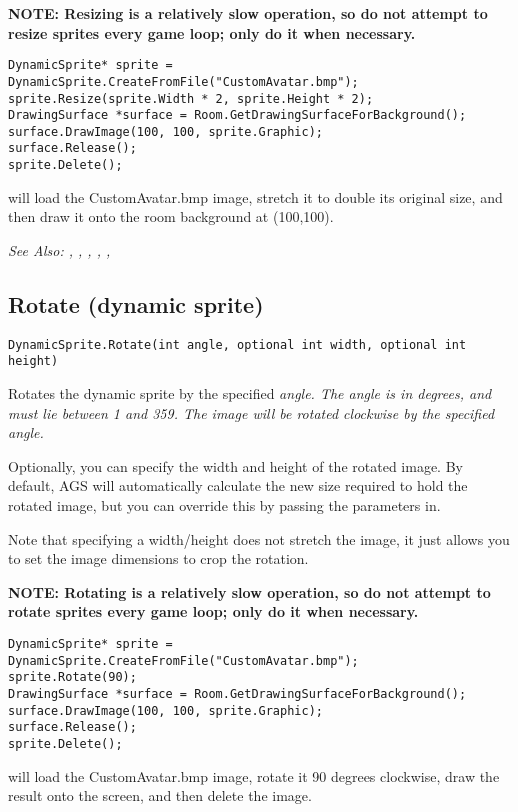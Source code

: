 \bf{NOTE:} Resizing is a relatively slow operation, so do not attempt to resize sprites
every game loop; only do it when necessary.

\begin{verbatim}
DynamicSprite* sprite = DynamicSprite.CreateFromFile("CustomAvatar.bmp");
sprite.Resize(sprite.Width * 2, sprite.Height * 2);
DrawingSurface *surface = Room.GetDrawingSurfaceForBackground();
surface.DrawImage(100, 100, sprite.Graphic);
surface.Release();
sprite.Delete();
\end{verbatim}
will load the CustomAvatar.bmp image, stretch it to double its original size, and then
draw it onto the room background at (100,100).

\it{See Also:} ,
,
,
,
,


\subsection{Rotate (dynamic sprite)}\label{DynamicSprite.Rotate}%

\begin{verbatim}
DynamicSprite.Rotate(int angle, optional int width, optional int height)
\end{verbatim}
Rotates the dynamic sprite by the specified \it{angle}. The angle is in degrees,
and must lie between 1 and 359. The image will be rotated clockwise by the specified angle.

Optionally, you can specify the width and height of the rotated image. By default, AGS
will automatically calculate the new size required to hold the rotated image, but
you can override this by passing the parameters in.

Note that specifying a width/height does not stretch the image, it just allows you
to set the image dimensions to crop the rotation.

\bf{NOTE:} Rotating is a relatively slow operation, so do not attempt to rotate sprites
every game loop; only do it when necessary.

\begin{verbatim}
DynamicSprite* sprite = DynamicSprite.CreateFromFile("CustomAvatar.bmp");
sprite.Rotate(90);
DrawingSurface *surface = Room.GetDrawingSurfaceForBackground();
surface.DrawImage(100, 100, sprite.Graphic);
surface.Release();
sprite.Delete();
\end{verbatim}
will load the CustomAvatar.bmp image, rotate it 90 degrees clockwise, draw the result
onto the screen, and then delete the image.

